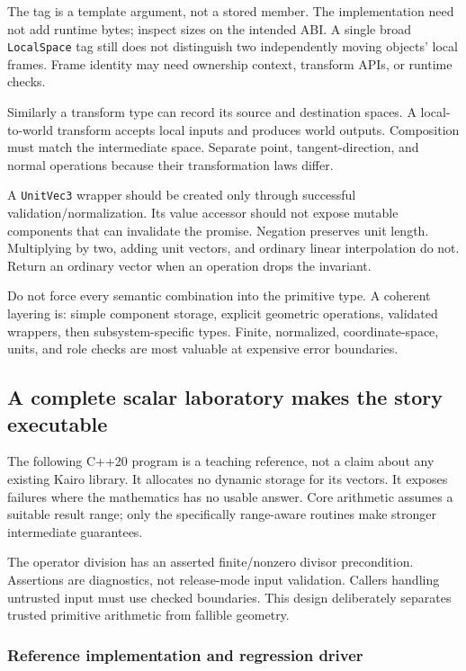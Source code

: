 The tag is a template argument, not a stored member. The implementation need not add runtime bytes; inspect sizes on the intended ABI. A single broad \texttt{LocalSpace} tag still does not distinguish two independently moving objects' local frames. Frame identity may need ownership context, transform APIs, or runtime checks.

Similarly a transform type can record its source and destination spaces. A local-to-world transform accepts local inputs and produces world outputs. Composition must match the intermediate space. Separate point, tangent-direction, and normal operations because their transformation laws differ.

A \texttt{UnitVec3} wrapper should be created only through successful validation/normalization. Its value accessor should not expose mutable components that can invalidate the promise. Negation preserves unit length. Multiplying by two, adding unit vectors, and ordinary linear interpolation do not. Return an ordinary vector when an operation drops the invariant.

Do not force every semantic combination into the primitive type. A coherent layering is: simple component storage, explicit geometric operations, validated wrappers, then subsystem-specific types. Finite, normalized, coordinate-space, units, and role checks are most valuable at expensive error boundaries.

\subsection{A complete scalar laboratory makes the story executable}\label{02-foundations-ii-ch037-a-complete-scalar-laboratory-makes-the-story-executable}

The following C++20 program is a teaching reference, not a claim about any existing Kairo library. It allocates no dynamic storage for its vectors. It exposes failures where the mathematics has no usable answer. Core arithmetic assumes a suitable result range; only the specifically range-aware routines make stronger intermediate guarantees.

The operator division has an asserted finite/nonzero divisor precondition. Assertions are diagnostics, not release-mode input validation. Callers handling untrusted input must use checked boundaries. This design deliberately separates trusted primitive arithmetic from fallible geometry.

\subsubsection{Reference implementation and regression driver}\label{02-foundations-ii-ch037-reference-implementation-and-regression-driver}


